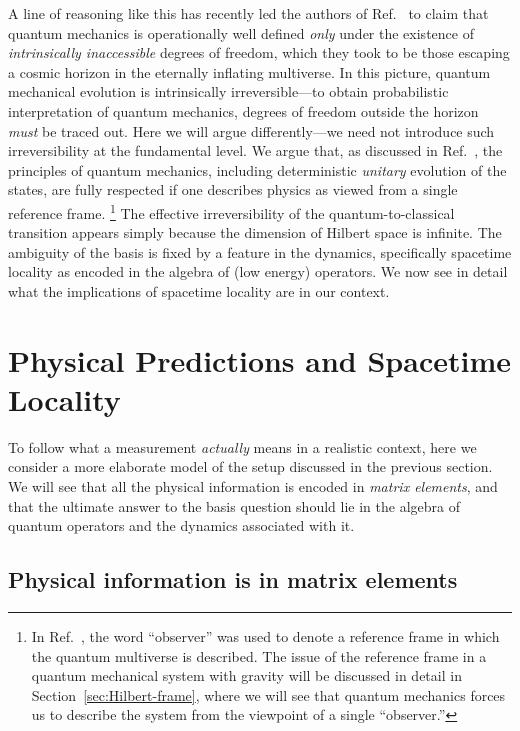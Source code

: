 \documentclass[12pt]{article}
\begin{document}
A line of reasoning like this has recently led the authors of 
Ref.~\cite{Bousso:2011up} to claim that quantum mechanics is operationally 
well defined {\it only} under the existence of {\it intrinsically 
inaccessible} degrees of freedom, which they took to be those escaping 
a cosmic horizon in the eternally inflating multiverse.  In this picture, 
quantum mechanical evolution is intrinsically irreversible---to obtain 
probabilistic interpretation of quantum mechanics, degrees of freedom 
outside the horizon {\it must} be traced out.  Here we will argue 
differently---we need not introduce such irreversibility at the fundamental 
level.  We argue that, as discussed in Ref.~\cite{Nomura:2011dt}, the 
principles of quantum mechanics, including deterministic {\it unitary} 
evolution of the states, are fully respected if one describes physics 
as viewed from a single reference frame.%
\footnote{In Ref.~\cite{Nomura:2011dt}, the word ``observer'' was used 
 to denote a reference frame in which the quantum multiverse is described. 
 The issue of the reference frame in a quantum mechanical system with 
 gravity will be discussed in detail in Section~\ref{sec:Hilbert-frame}, 
 where we will see that quantum mechanics forces us to describe the 
 system from the viewpoint of a single ``observer.''}
The effective irreversibility of the quantum-to-classical transition 
appears simply because the dimension of Hilbert space is infinite.  The 
ambiguity of the basis is fixed by a feature in the dynamics, specifically 
spacetime locality as encoded in the algebra of (low energy) operators. 
We now see in detail what the implications of spacetime locality 
are in our context.


\section{Physical Predictions and Spacetime Locality}
\label{sec:locality}

To follow what a measurement {\it actually} means in a realistic context, 
here we consider a more elaborate model of the setup discussed in the 
previous section.  We will see that all the physical information is 
encoded in {\it matrix elements}, and that the ultimate answer to the 
basis question should lie in the algebra of quantum operators and the 
dynamics associated with it.


\subsection{Physical information is in matrix elements}
\label{subsec:relative}
\end{document}
